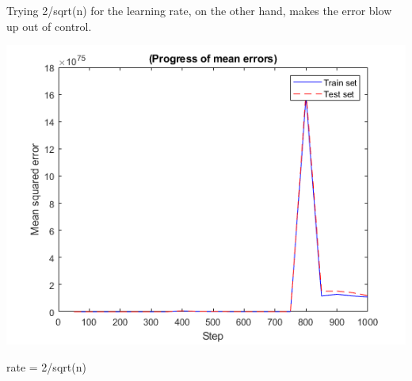 \documentclass[a4paper]{article}
\begin{document}
\noindent 
Trying 2/sqrt(n) for the learning rate, on the other hand, makes the error blow up out of control.

\begin{center}
    \includegraphics[scale=1]{3d-3.png}
    \caption{rate = 2/sqrt(n)}
\end{center}
\end{document}
